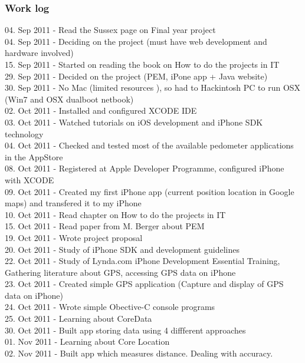 \documentclass[12pt, a4paper]{report}   %
\begin{document}
\begin{enumerate}
\subsubsection{Work log}
04. Sep 2011 - Read the Sussex page on Final year project \\
04. Sep 2011 - Deciding on the project (must have web development and hardware involved)\\
15. Sep 2011 - Started on reading the book on How to do the projects in IT\\
29. Sep 2011 - Decided on the project (PEM, iPone app + Java website)\\
30. Sep 2011 - No Mac (limited resources ), so had to Hackintosh PC to run OSX (Win7 and OSX dualboot netbook)\\
02. Oct 2011 - Installed and configured XCODE IDE\\
03. Oct 2011 - Watched tutorials on iOS development and iPhone SDK technology\\
04. Oct 2011 - Checked and tested most of the available pedometer applications in the AppStore\\
08. Oct 2011 - Registered at Apple Developer Programme, configured iPhone with XCODE\\
09. Oct 2011 - Created my first iPhone app (current position location in Google maps) and transfered it to my iPhone\\
10. Oct 2011 - Read chapter on How to do the projects in IT\\
15. Oct 2011 - Read paper from M. Berger about PEM\\
19. Oct 2011 - Wrote project proposal\\
20. Oct 2011 - Study of iPhone SDK and development guidelines\\
22. Oct 2011 - Study of Lynda.com iPhone Development Essential Training, Gathering literature about GPS, accessing GPS data on iPhone\\
23. Oct 2011 - Created simple GPS application (Capture and display of GPS data on iPhone)\\
24. Oct 2011 - Wrote simple Obective-C console programs\\
25. Oct 2011 - Learning about CoreData\\
30. Oct 2011 - Built app storing data using 4 diffferent approaches\\
01. Nov 2011 - Learning about Core Location\\
02. Nov 2011 - Built app which measures distance. Dealing with accuracy.\\

\end{enumerate}
\end{document}
